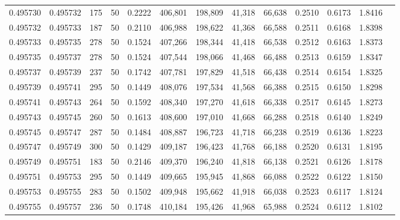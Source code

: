 \begin{tabular}{rrrrrrrrrrrrr}
0.495730 & 0.495732 &   175 &  50 &                                     0.2222 & 406,801 & 198,809 &  41,318 &  66,638 & 0.2510 & 0.6173 & 1.8416 \\
0.495732 & 0.495733 &   187 &  50 &                                     0.2110 & 406,988 & 198,622 &  41,368 &  66,588 & 0.2511 & 0.6168 & 1.8398 \\
0.495733 & 0.495735 &   278 &  50 &                                     0.1524 & 407,266 & 198,344 &  41,418 &  66,538 & 0.2512 & 0.6163 & 1.8373 \\
0.495735 & 0.495737 &   278 &  50 &                                     0.1524 & 407,544 & 198,066 &  41,468 &  66,488 & 0.2513 & 0.6159 & 1.8347 \\
0.495737 & 0.495739 &   237 &  50 &                                     0.1742 & 407,781 & 197,829 &  41,518 &  66,438 & 0.2514 & 0.6154 & 1.8325 \\
0.495739 & 0.495741 &   295 &  50 &                                     0.1449 & 408,076 & 197,534 &  41,568 &  66,388 & 0.2515 & 0.6150 & 1.8298 \\
0.495741 & 0.495743 &   264 &  50 &                                     0.1592 & 408,340 & 197,270 &  41,618 &  66,338 & 0.2517 & 0.6145 & 1.8273 \\
0.495743 & 0.495745 &   260 &  50 &                                     0.1613 & 408,600 & 197,010 &  41,668 &  66,288 & 0.2518 & 0.6140 & 1.8249 \\
0.495745 & 0.495747 &   287 &  50 &                                     0.1484 & 408,887 & 196,723 &  41,718 &  66,238 & 0.2519 & 0.6136 & 1.8223 \\
0.495747 & 0.495749 &   300 &  50 &                                     0.1429 & 409,187 & 196,423 &  41,768 &  66,188 & 0.2520 & 0.6131 & 1.8195 \\
0.495749 & 0.495751 &   183 &  50 &                                     0.2146 & 409,370 & 196,240 &  41,818 &  66,138 & 0.2521 & 0.6126 & 1.8178 \\
0.495751 & 0.495753 &   295 &  50 &                                     0.1449 & 409,665 & 195,945 &  41,868 &  66,088 & 0.2522 & 0.6122 & 1.8150 \\
0.495753 & 0.495755 &   283 &  50 &                                     0.1502 & 409,948 & 195,662 &  41,918 &  66,038 & 0.2523 & 0.6117 & 1.8124 \\
0.495755 & 0.495757 &   236 &  50 &                                     0.1748 & 410,184 & 195,426 &  41,968 &  65,988 & 0.2524 & 0.6112 & 1.8102 \\

\end{tabular}
